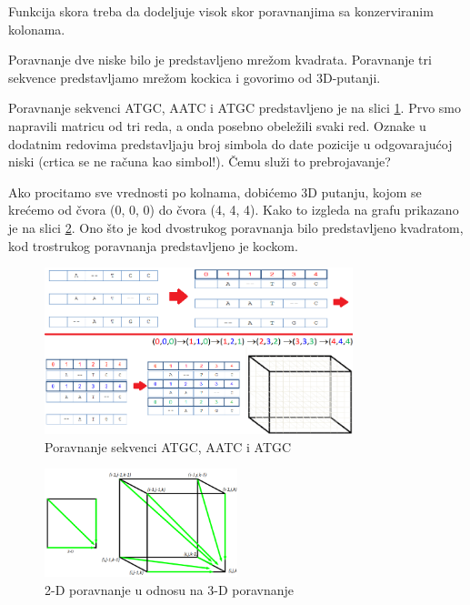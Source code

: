 Funkcija skora treba da dodeljuje visok skor poravnanjima sa konzerviranim kolonama. 




Poravnanje dve niske bilo je predstavljeno mrežom kvadrata. Poravnanje tri sekvence predstavljamo mrežom kockica i govorimo od 3D-putanji. 

Poravnanje sekvenci ATGC, AATC i ATGC predstavljeno je na slici \ref{slika:3d}. Prvo smo napravili matricu od tri reda, a onda posebno obeležili svaki red. Oznake u dodatnim redovima predstavljaju broj simbola do date pozicije u odgovarajućoj niski (crtica se ne računa kao simbol!). Čemu služi to prebrojavanje? 

Ako procitamo sve vrednosti po kolnama, dobićemo 3D putanju, kojom se krećemo od čvora (0, 0, 0) do čvora (4, 4, 4). Kako to izgleda na grafu prikazano je na slici \ref{slika:2d3d}. Ono što je kod dvostrukog poravnanja bilo predstavljeno kvadratom, kod trostrukog poravnanja predstavljeno je kockom. 

\begin{figure}[H]
\centering
\includegraphics[width=0.8\textwidth]{poglavlja/5/slike/3dPoravnanja.png}
\caption{Poravnanje sekvenci ATGC, AATC i ATGC}
\label{slika:3d}
\end{figure}

\begin{figure}[h]
\centering
\includegraphics[width=0.5\textwidth]{poglavlja/5/slike/2d3d.png}
\caption{2-D poravnanje u odnosu na 3-D poravnanje}
\label{slika:2d3d}
\end{figure}


